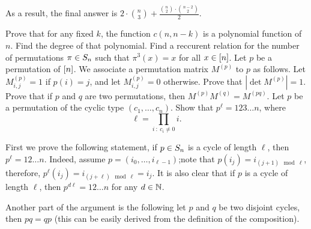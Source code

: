 \begin{chapterendexercises}
\begin{solution}
      As a result, the final answer is $2 \cdot \binom{n}{3} + \frac{\binom{n}{2}
      \cdot \binom{n - 2}{2}}{2}$.
    \end{solution}
  \exercise Prove that for any fixed $k$, the function $c(n, n - k)$ is a
    polynomial function of $n$. Find the degree of that polynomial.
  \exercise Find a reccurent relation for the number of permutations $\pi \in
    S_{n}$ such that $\pi^3(x) = x$ for all $x \in {[{n}]}$.
  \exercise Let $p$ be a permutation of ${[{n}]}$. We associate a permutation matrix
    $M^{(p)}$ to $p$ as follows. Let $M^{(p)}_{i, j} = 1$ if $p(i) = j$, and let
    $M^{(p)}_{i, j} = 0$ otherwise. Prove that $|\det M^{(p)}| = 1$.
  \exercise Prove that if $p$ and $q$ are two permutations, then
    $M^{(p)} M^{(q)} = M^{(pq)}$.
  \exercise Let $p$ be a permutation of the cyclic type $(c_1, \dots, c_n)$.
    Show that $p^\ell = 1 2 3 \dots n$, where
    \[
      \ell = \prod_{i ~:~ c_i \neq 0} i.
    \]
    \begin{solution}
      First we prove the following statement, if $p \in S_{n}$ is a cycle of
      length $\ell$, then $p^\ell = 12 \dots n$. Indeed, assume $p = (i_0,
      \dots, i_{\ell - 1})$;note that $p(i_j) = i_{(j + 1) \mod \ell}$,
      therefore, $p^\ell(i_j) = i_{(j + \ell) \mod \ell} = i_j$. It is also
      clear that if $p$ is a cycle of length $\ell$, then $p^{d\ell} = 
      12 \dots n$ for any $d \in {\mathbb{N}}$.

      Another part of the argument is the following let $p$ and $q$ be two
      disjoint cycles, then $pq = qp$ (this can be easily derived from the
      definition of the composition).


\end{solution}
\end{chapterendexercises}
